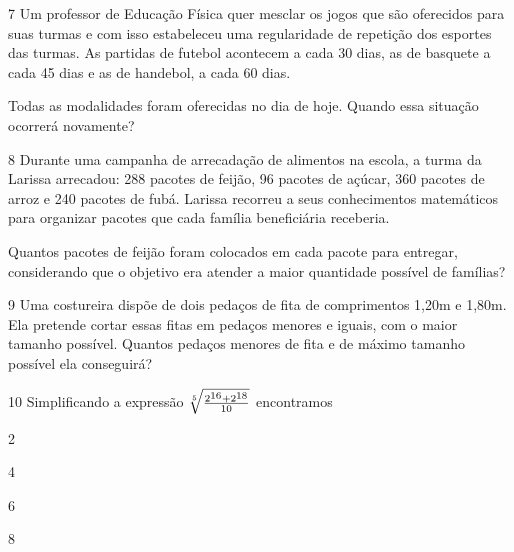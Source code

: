 \num{7} Um professor de Educação Física quer mesclar os jogos que são
oferecidos para suas turmas e com isso estabeleceu uma regularidade de
repetição dos esportes das turmas. As partidas de futebol acontecem a 
cada 30 dias, as de basquete a cada 45 dias e as de handebol, a cada 60 dias.

Todas as modalidades foram oferecidas no dia de hoje. Quando essa
situação ocorrerá novamente?

\begin{emptybox}
\vspace{6cm}
\end{emptybox}

\num{8} Durante uma campanha de arrecadação de alimentos na escola,
a turma da Larissa arrecadou: 288 pacotes de feijão, 96 pacotes de açúcar,
360 pacotes de arroz e 240 pacotes de fubá. Larissa recorreu a seus
conhecimentos matemáticos para organizar pacotes que cada família
beneficiária receberia.

Quantos pacotes de feijão foram colocados em cada pacote para entregar,
considerando que o objetivo era atender a maior quantidade possível de
famílias?

\begin{emptybox}
\vspace{5cm}
\end{emptybox}

\num{9} Uma costureira dispõe de dois pedaços de fita de comprimentos
1,20m e 1,80m. Ela pretende cortar essas fitas em pedaços menores e 
iguais, com o maior tamanho possível. Quantos pedaços menores de fita 
e de máximo tamanho possível ela conseguirá?

\begin{emptybox}
\vspace{5cm}
\end{emptybox}

\num{10} Simplificando a expressão $\sqrt[5]{\frac{2\textsuperscript{16}+2\textsuperscript{18}}{10}}$ encontramos

\begin{minipage}{.5\textwidth}
\begin{escolha}
\item 2
\item 4
\item 6
\item 8
\end{escolha}
\end{minipage}

